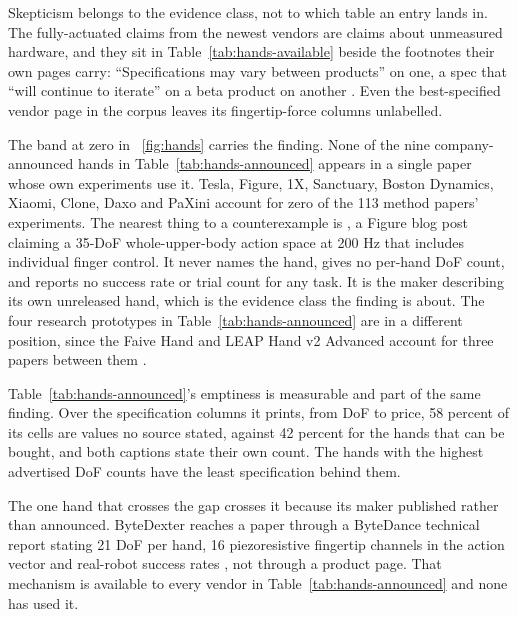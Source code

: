 Skepticism belongs to the evidence class, not to which table an entry lands in. The
fully-actuated claims from the newest vendors are claims about unmeasured hardware, and they sit in
Table~\ref{tab:hands-available} beside the footnotes their own pages carry: ``Specifications may
vary between products'' on one, a spec that ``will continue to iterate'' on a beta product on
another \cite{sharpa_wave_2026,wuji_hand_2025}. Even the best-specified vendor page in the corpus
leaves its fingertip-force columns unlabelled.


\label{sec:hands:gap}
The band at zero in \figurename~\ref{fig:hands} carries the finding. None of the nine
company-announced hands in Table~\ref{tab:hands-announced} appears in a single paper whose
own experiments use it. Tesla, Figure, 1X, Sanctuary, Boston Dynamics, Xiaomi, Clone, Daxo and
PaXini account for zero of the 113 method papers' experiments. The nearest thing to a
counterexample is \cite{helix_2025}, a Figure blog post claiming a 35-DoF whole-upper-body action
space at 200 Hz that includes individual finger control. It never names the hand, gives no
per-hand DoF count, and reports no success rate or trial count for any task. It is the maker
describing its own unreleased hand, which is the evidence class the finding is about. The four
research prototypes in Table~\ref{tab:hands-announced} are in a different position, since the
Faive Hand and LEAP Hand v2 Advanced account for three papers between them
\cite{graspxl_2024,bidex_teleop_2024}.

Table~\ref{tab:hands-announced}'s emptiness is measurable and part of the same finding. Over the
specification columns it prints, from DoF to price, 58 percent of its cells are values no source
stated, against 42 percent for the hands that can be bought, and both captions state their own
count. The hands with the highest advertised DoF counts have the least specification behind
them.

The one hand that crosses the gap crosses it because its maker published rather than announced.
ByteDexter reaches a paper through a ByteDance technical report stating 21 DoF per hand, 16
piezoresistive fingertip channels in the action vector and real-robot success rates
\cite{gr_dexter_2025}, not through a product page. That mechanism is available to every vendor in
Table~\ref{tab:hands-announced} and none has used it.

